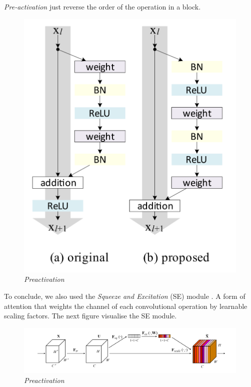 \documentclass[../document.tex]{subfiles}
\begin{document}
\emph{Pre-activation} just reverse the order of the operation in a block.
\begin{figure}[H]
	\centering
	\includegraphics[scale=0.3]{img/implementation/estimator/preactivation.png}
	\caption{\emph{Preactivation}}
\end{figure}
To conclude, we also used the \emph{Squeeze and Excitation} (SE) module \cite{hu2017squeeze}. A form of attention that weights the channel of each convolutional operation by learnable scaling factors. The next figure visualise the SE module.
\begin{figure}[H]
	\centering
	\includegraphics[width=\linewidth]{img/implementation/estimator/se.png}
	\caption{\emph{Preactivation}}
\end{figure}
\end{document}
